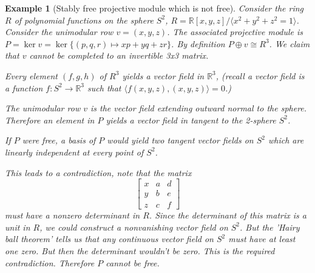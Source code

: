 \documentclass[12pt]{article}
\numberwithin{equation}{section}
\newcommand{\R}{\mathbb{R}}
\newcounter{dummy} \numberwithin{dummy}{section}
\newtheorem{example}[dummy]{Example}
\begin{document}
	\begin{example}[Stably free projective module which is not free]
		Consider the ring $R$ of polynomial functions on the sphere $S^2$, $R=\mathbb{R}[x,y,z]/\langle x^2+y^2+z^2=1 \rangle$. Consider the unimodular row $v=(x,y,z)$. The associated projective module is $P=\ker v = \ker \{(p,q,r) \mapsto xp+yq+zr\}$. By definition $P \oplus v \cong R^3$. We claim that $v$ cannot be completed to an invertible 3x3 matrix.
		
		Every element $(f, g, h)$ of $R^3$ yields a vector field in $\R^3$, (recall a vector field is a function $f:S^2 \to \R^3$ such that $\langle f(x,y,z), (x,y,z) \rangle=0 $.)
		
		The unimodular row $v$ is the vector field extending outward normal to the sphere. Therefore an element in $P$ yields a vector field in tangent to the 2-sphere $S^2$. 
		
		If $P$ were free, a basis of $P$ would yield two tangent vector fields on $S^2$ which are linearly independent at every point of $S^2$.
		
		This leads to a contradiction, note that the matrix
		\[
		\begin{bmatrix}
			x & a & d \\
			y & b & e \\
			z & c & f
		\end{bmatrix}
		\]
		must have a nonzero determinant in $R$. Since the determinant of this matrix is a unit in $R$, we could construct a nonvanishing vector field on $S^2$. But the 'Hairy ball theorem' \cite{hairyball} tells us that any continuous vector field on $S^2$ must have at least one zero.
		But then the determinant wouldn't be zero. This is the required contradiction. Therefore $P$ cannot be free.
		
	\end{example}
	
\end{document}
